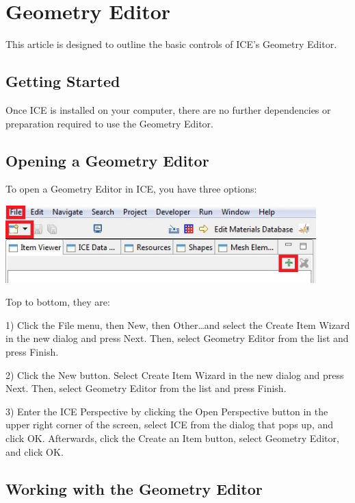 \section{Geometry Editor}

This article is designed to outline the basic controls of ICE's Geometry Editor.

\subsection{Getting Started}

Once ICE is installed on your computer, there are no further dependencies or
preparation required to use the Geometry Editor.

\subsection{Opening a Geometry Editor}

To open a Geometry Editor in ICE, you have three options:

\begin{center}
\includegraphics[width=12cm]{images/CreateNewGeometryOptions.jpg}
\end{center}

Top to bottom, they are:

1) Click the File menu, then New, then Other\ldots and select the Create Item
Wizard in the new dialog and press Next. Then, select Geometry Editor from the
list and press Finish.

 
2) Click the New button. Select Create Item Wizard in the new dialog and
press Next. Then, select Geometry Editor from the list and press Finish.


3) Enter the ICE Perspective by clicking the Open Perspective button in the
upper right corner of the screen, select ICE from the dialog that pops up, and
click OK. Afterwards, click the Create an Item button, select Geometry Editor,
and click OK.

\subsection{Working with the Geometry Editor}


